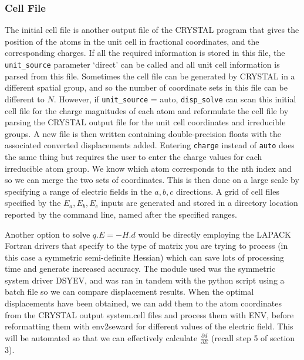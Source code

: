 \documentclass[10pt]{article}
\begin{document}
\subsubsection{Cell File}
The initial cell file is another output file of the CRYSTAL program that gives the position of the atoms in the unit cell in fractional coordinates, and the corresponding charges. If all the required information is stored in this file, the \texttt{unit\_source} parameter `direct' can be called and all unit cell information is parsed from this file. Sometimes the cell file can be generated by CRYSTAL in a different spatial group, and so the number of coordinate sets in this file can be different to $N$. However, if \texttt{unit\_source} = auto, \texttt{disp\_solve} can scan this initial cell file for the charge magnitudes of each atom and reformulate the cell file by parsing the CRYSTAL output file for the unit cell coordinates and irreducible groups. A new file is then written containing double-precision floats with the associated converted displacements added. Entering \texttt{charge} instead of \texttt{auto} does the same thing but requires the user to enter the charge values for each irreducible atom group. We know which atom corresponds to the nth index and so we can merge the two sets of coordinates. This is then done on a large scale by specifying a range of electric fields in the $a,b,c$ directions. A grid of cell files specified by the $E_a,E_b,E_c$ inputs are generated and stored in a directory location reported by the command line, named after the specified ranges. 

Another option to solve $q.E = -H.d$ would be directly employing the LAPACK Fortran drivers that specify to the type of matrix you are trying to process (in this case a symmetric semi-definite Hessian) which can save lots of processing time and generate increased accuracy. The module used was the symmetric system driver DSYEV, and was ran in tandem with the python script using a batch file so we can compare displacement results. When the optimal displacements have been obtained, we can add them to the atom coordinates from the CRYSTAL output system.cell files and process them with ENV, before reformatting them with env2seward for different values of the electric field. This will be automated so that we can effectively calculate $\frac{\partial d}{\partial E}$ (recall step 5 of section 3).


\end{document}

